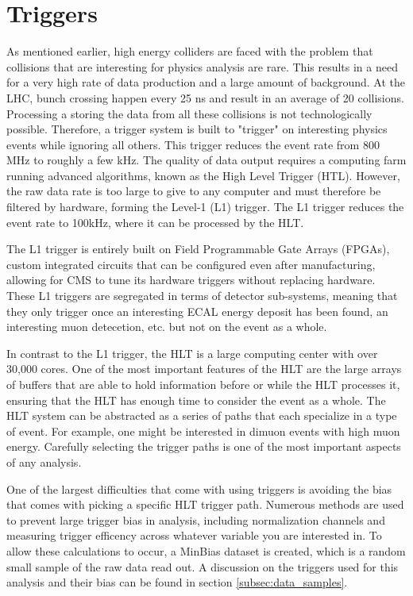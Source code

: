 \section{Triggers}
\label{sec:triggers}

As mentioned earlier, high energy colliders are faced with the problem that collisions that are interesting for physics analysis are rare. This results in a need for a very high rate of data production and a large amount of background. 
At the LHC, bunch crossing happen every 25 ns and result in an average of 20 collisions. Processing a storing the data from all these collisions is not technologically possible. Therefore, a trigger system is built to "trigger" on interesting physics events while ignoring all others. This trigger reduces the event rate from 800 MHz to roughly a few kHz. The quality of data output requires a computing farm running advanced algorithms, known as the High Level Trigger (HTL). However, the raw data rate is too large to give to any computer and must therefore be filtered by hardware, forming the Level-1 (L1) trigger. The L1 trigger reduces the event rate to 100kHz, where it can be processed by the HLT. %

The L1 trigger is entirely built on Field Programmable Gate Arrays (FPGAs), custom integrated circuits that can be configured even after manufacturing, allowing for CMS to tune its hardware triggers without replacing hardware. These L1 triggers are segregated in terms of detector sub-systems, meaning that they only trigger once an interesting ECAL energy deposit has been found, an interesting muon detecetion, etc. but not on the event as a whole. 

In contrast to the L1 trigger, the HLT is a large computing center with over 30,000 cores. One of the most important features of the HLT are the large arrays of buffers that are able to hold information before or while the HLT processes it, ensuring that the HLT has enough time to consider the event as a whole. The HLT system can be abstracted as a series of paths that each specialize in a type of event. For example, one might be interested in dimuon events with high muon energy. Carefully selecting the trigger paths is one of the most important aspects of any analysis. 

One of the largest difficulties that come with using triggers is avoiding the bias that comes with picking a specific HLT trigger path. Numerous methods are used to prevent large trigger bias in analysis, including normalization channels and measuring trigger efficency across whatever variable you are interested in. To allow these calculations to occur, a MinBias dataset is created, which is a random small sample of the raw data read out. A discussion on the triggers used for this analysis and their bias can be found in section \ref{subsec:data_samples}.

